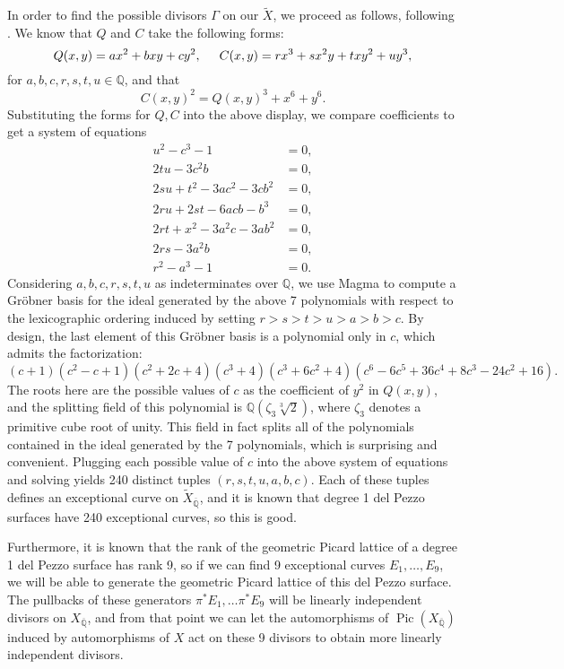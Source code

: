 \documentclass[12pt,twoside]{reedthesis}
\theoremstyle{plain}
\theoremstyle{definition}
\theoremstyle{remark}
\newcommand{\QQ}{\mathbb{Q}}
\newcommand{\Pic}{\operatorname{Pic}}
\begin{document}
In order to find the possible divisors $\Gamma$ on our $\widetilde{X}$, we proceed as follows, following \cite{tonyThesis}. We know that $Q$ and $C$ take the following forms:
\[
Q(x,y)=ax^2+bxy+cy^2,\hspace{0.5cm} C(x,y)=rx^3+sx^2y+txy^2+uy^3,
\]
for $a,b,c,r,s,t,u\in\QQ$, and that
\[
C(x,y)^2=Q(x,y)^3+x^6+y^6.
\]
Substituting the forms for $Q,C$ into the above display, we compare coefficients to get a system of equations
\begin{align*}
u^2-c^3-1&=0,\\
2tu-3c^2b&=0,\\
2su+t^2-3ac^2-3cb^2&=0,\\
2ru+2st-6acb-b^3&=0,\\
2rt+x^2-3a^2c-3ab^2&=0,\\
2rs-3a^2b&=0,\\
r^2-a^3-1&=0.
\end{align*}
Considering $a,b,c,r,s,t,u$ as indeterminates over $\QQ$, we use Magma to compute a Gr\"obner basis for the ideal generated by the above 7 polynomials with respect to the lexicographic ordering induced by setting $r>s>t>u>a>b>c$. By design, the last element of this Gr\"obner basis is a polynomial only in $c$, which admits the factorization:
\[
(c+1)(c^2-c+1)(c^2+2c+4)(c^3+4)(c^3+6c^2+4)(c^6-6c^5+36c^4+8c^3-24c^2+16).
\]
The roots here are the possible values of $c$ as the coefficient of $y^2$ in $Q(x,y)$, and the splitting field of this polynomial is $\QQ(\zeta_3 \sqrt[3]{2})$, where $\zeta_3$ denotes a primitive cube root of unity. This field in fact splits all of the polynomials contained in the ideal generated by the 7 polynomials, which is surprising and convenient. Plugging each possible value of $c$ into the above system of equations and solving yields 240 distinct tuples $(r,s,t,u,a,b,c)$.  Each of these tuples defines an exceptional curve on $\widetilde{X}_{\overline{\QQ}}$, and it is known that degree 1 del Pezzo surfaces have 240 exceptional curves, so this is good.

Furthermore, it is known that the rank of the geometric Picard lattice of a degree 1 del Pezzo surface has rank 9, so if we can find 9 exceptional curves $E_1,\ldots, E_9$, we will be able to generate the geometric Picard lattice of this del Pezzo surface. The pullbacks of these generators $\pi^*E_1,\ldots\pi^*E_9$ will be linearly independent divisors on $X_{\overline{\QQ}}$, and from that point we can let the automorphisms of $\Pic(X_{\overline{\QQ}})$ induced by automorphisms of $X$ act on these 9 divisors to obtain more linearly independent divisors.
\end{document}
